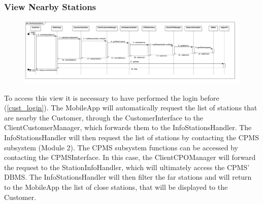 \subsubsection{View Nearby Stations}\label{nearby_stations}
\begin{figure}[H]
    \begin{center}
        \includegraphics[width=\textwidth]{img/runtime/nearby_stations}
    \end{center}
\end{figure}
To access this view it is necessary to have performed the login before (\ref{cust_login}). The MobileApp will automatically request the list of stations that are nearby the Customer, through the CustomerInterface to the ClientCustomerManager, which forwards them to the InfoStationsHandler. The InfoStationsHandler will then request the list of stations by contacting the CPMS subsystem (Module 2). The CPMS subsystem functions can be accessed by contacting the CPMSInterface. In this case, the ClientCPOManager will forward the request to the StationInfoHandler, which will ultimately access the CPMS' DBMS. The InfoStationsHandler will then filter the far stations and will return to the MobileApp the list of close stations, that will be displayed to the Customer.
